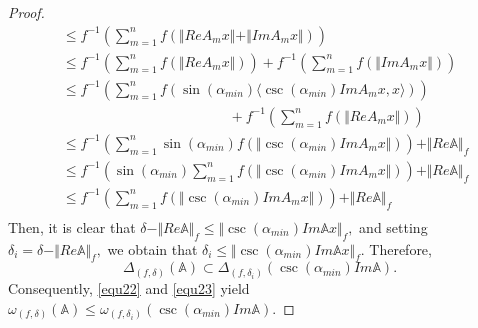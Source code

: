 \documentclass[10pt,a4paper]{amsart}
\begin{document}
\begin{proof}
\begin{align*}
&\leq f^{-1} \left( \sum\limits_{m=1}^{n}f\left( \Vert ReA_{m}x \Vert + \Vert Im A_{m}x \Vert \right)  \right) \\
&\leq f^{-1} \left( \sum\limits_{m=1}^{n}f\left( \Vert ReA_{m}x \Vert \right)  \right)+f^{-1} \left( \sum\limits_{m=1}^{n}f\left( \Vert Im A_{m}x \Vert \right)  \right) \\
&\leq f^{-1}\left( \sum\limits_{m=1}^{n}f\left(\sin(\alpha_{min})\langle \csc(\alpha_{min})Im A_{m}x,x\rangle \right)  \right)\\
&\hspace{5cm} +f^{-1} \left( \sum\limits_{m=1}^{n}f\left( \Vert ReA_{m}x \Vert \right)  \right) \\
&\leq f^{-1} \left( \sum\limits_{m=1}^{n}\sin(\alpha_{min})f\left( \Vert \csc(\alpha_{min})ImA_{m}x \Vert \right)  \right)+ \Vert Re \mathbb{A} \Vert_{f}\\
&\leq f^{-1}\left( \sin(\alpha_{min})\sum\limits_{m=1}^{n}f\left( \Vert \csc(\alpha_{min})ImA_{m}x \Vert \right)  \right) + \Vert Re \mathbb{A} \Vert_{f}\\
&\leq f^{-1}\left(\sum\limits_{m=1}^{n}f\left( \Vert \csc(\alpha_{min})ImA_{m}x \Vert \right)  \right) + \Vert Re \mathbb{A} \Vert_{f}\\
\end{align*}
Then, it is clear that
\(
\delta - \Vert Re \mathbb{A} \Vert_{f} \leq  \Vert \csc(\alpha_{min})Im\mathbb{A}x \Vert_{f},
\)
and setting $\delta_{i}=\delta - \Vert Re \mathbb{A} \Vert_{f},   $
we obtain that
\(
\delta_{i} \leq  \Vert \csc(\alpha_{min})Im\mathbb{A}x \Vert_{f}.
\)
Therefore,
\begin{equation}
\label{equ23}
\Delta_{(f,\delta)}(\mathbb{A})\subset\Delta_{(f,\delta_{i})}\left( \csc(\alpha_{min})Im\mathbb{A} \right) .
\end{equation}
Consequently, \eqref{equ22} and \eqref{equ23} yield
\(
\omega_{(f,\delta)}(\mathbb{A})\leq \omega_{(f,\delta_{i})}(\csc(\alpha_{min})Im\mathbb{A}).
\)
 \end{proof}
\end{document}

